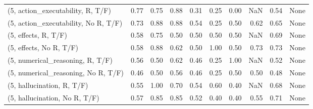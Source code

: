 \begin{table*}[h!]
\begin{adjustbox}{width=2\columnwidth,center}
\begin{tabular}{lrrr|rrr|rrr}
(5, action\_executability, R, T/F)    &                      0.77 &                  0.75 &                      0.88 &                          0.31 &                      0.25 &                          0.00 &                                    NaN &                               0.54 &                                  None \\
(5, action\_executability, No R, T/F) &                      0.73 &                  0.88 &                      0.88 &                          0.54 &                      0.25 &                          0.50 &                                   0.62 &                               0.65 &                                  None \\
(5, effects, R, T/F)                 &                      0.58 &                  0.75 &                      0.50 &                          0.50 &                      0.50 &                          0.50 &                                    NaN &                               0.69 &                                  None \\
(5, effects, No R, T/F)              &                      0.58 &                  0.88 &                      0.62 &                          0.50 &                      1.00 &                          0.50 &                                   0.73 &                               0.73 &                                  None \\
(5, numerical\_reasoning, R, T/F)     &                      0.56 &                  0.50 &                      0.62 &                          0.46 &                      0.25 &                          1.00 &                                    NaN &                               0.52 &                                  None \\
(5, numerical\_reasoning, No R, T/F)  &                      0.46 &                  0.50 &                      0.56 &                          0.46 &                      0.25 &                          0.50 &                                   0.50 &                               0.48 &                                  None \\
(5, hallucination, R, T/F)           &                      0.55 &                  1.00 &                      0.70 &                          0.54 &                      0.60 &                          0.40 &                                    NaN &                               0.68 &                                  None \\
(5, hallucination, No R, T/F)        &                      0.57 &                  0.85 &                      0.85 &                          0.52 &                      0.40 &                          0.40 &                                   0.55 &                               0.71 &                                  None \\

\end{tabular}
\end{adjustbox}
\end{table*}
